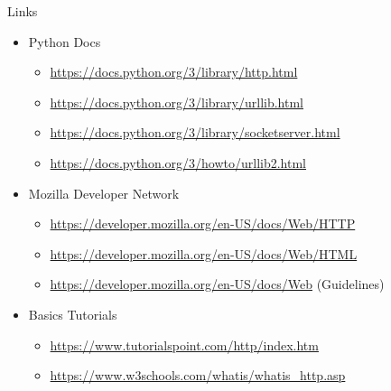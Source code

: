 \begin{frame}{Links}
%
\begin{itemize}
\item Python Docs
	\begin{itemize}
	\item \url{https://docs.python.org/3/library/http.html}
	\item \url{https://docs.python.org/3/library/urllib.html}
	\item \url{https://docs.python.org/3/library/socketserver.html}
	\item \url{https://docs.python.org/3/howto/urllib2.html}
	\end{itemize}
\item Mozilla Developer Network 
	\begin{itemize}
	\item \url{https://developer.mozilla.org/en-US/docs/Web/HTTP}
	\item \url{https://developer.mozilla.org/en-US/docs/Web/HTML}
	\item \url{https://developer.mozilla.org/en-US/docs/Web} (Guidelines)
	\end{itemize}
\item Basics Tutorials
	\begin{itemize}
	\item \url{https://www.tutorialspoint.com/http/index.htm}
	\item \url{https://www.w3schools.com/whatis/whatis_http.asp}
	\end{itemize}
\end{itemize}
%
\end{frame}

